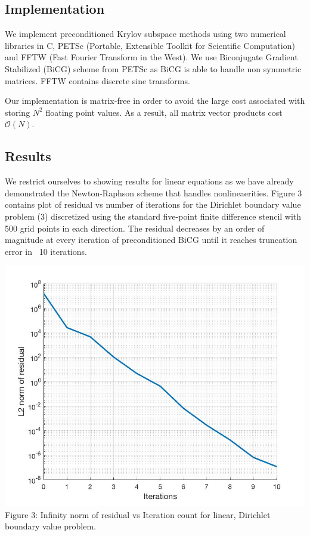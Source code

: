 \documentclass[12pt]{article}
\begin{document}
\begin{multicols}{2}
\subsection{Implementation}
We implement preconditioned Krylov subspace methods using two numerical libraries in C, PETSc (Portable, Extensible Toolkit for Scientific Computation) and FFTW (Fast Fourier Transform in the West). We use Biconjugate Gradient Stabilized (BiCG) scheme from PETSc as BiCG is able to handle non symmetric matrices. FFTW contains discrete sine transforms.

Our implementation is matrix-free in order to avoid the large cost associated with storing $N^2$ floating point values. As a result, all matrix vector products cost $\mathcal{O}(N).$

\subsection{Results}
We restrict ourselves to showing results for linear equations as we have already demonstrated the Newton-Raphson scheme that handles nonlineaerities. Figure 3 contains plot of residual vs number of iterations for the Dirichlet boundary value problem (3) discretized using the standard five-point finite difference stencil with 500 grid points in each direction. The residual decreases by an order of magnitude at every iteration of preconditioned BiCG until it reaches truncation error in ~10 iterations.

\begin{center}
    \includegraphics[scale=0.25]{res.jpg} \\
    \small{Figure 3: Infinity norm of residual vs Iteration count for linear, Dirichlet boundary value problem.}
\end{center}


\end{multicols}
\end{document}
